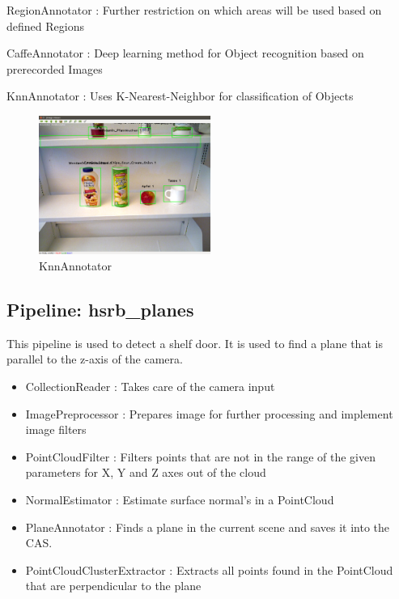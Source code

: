 \documentclass[main.tex]{subfiles}
\begin{document}
\begin{itemize}
    \item RegionAnnotator : Further restriction on which areas will be used based on defined Regions 
    \item CaffeAnnotator : Deep learning method for Object recognition based on prerecorded Images 

    \begin{minipage}[t]{\textwidth}
    \item KnnAnnotator : Uses K-Nearest-Neighbor for classification of Objects 
        \begin{figure}[H]
                \centering
                 \includegraphics[width=0.5\textwidth]{pictures/2d/KnnAnnotator.png}
                \caption{KnnAnnotator}
          \end{figure}
    \end{minipage}
\end{itemize}



            \subsection{Pipeline: hsrb\_planes} 
This pipeline is used to detect a shelf door. It is used to find a plane that is parallel to the z-axis of the camera.
\begin{itemize}
    \item CollectionReader : Takes care of the camera input
    \item ImagePreprocessor : Prepares image for further processing and implement image filters  
    \item PointCloudFilter : Filters points that are not in the range of the given parameters for X, Y and Z axes out of the cloud
    \item NormalEstimator : Estimate surface normal's in a PointCloud 
    \item PlaneAnnotator : Finds a plane in the current scene and saves it into the CAS.
    \item PointCloudClusterExtractor : Extracts all points found in the PointCloud that are perpendicular to the plane 
\end{itemize}
\end{document}
